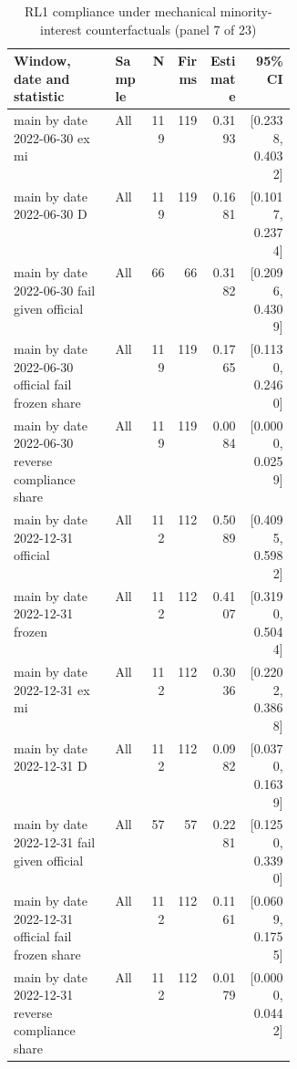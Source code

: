 \begin{table}[!htbp]\centering\scriptsize
\caption{RL1 compliance under mechanical minority-interest counterfactuals (panel 7 of 23)}
\begin{threeparttable}
\begin{tabular}{p{0.36\linewidth}lrrrr}
\toprule
Window, date and statistic & Sample & N & Firms & Estimate & 95\% CI \\
\midrule
main by date 2022-06-30 ex mi & All & 119 & 119 & 0.3193 & [0.2338, 0.4032] \\
main by date 2022-06-30 D & All & 119 & 119 & 0.1681 & [0.1017, 0.2374] \\
main by date 2022-06-30 fail given official & All & 66 & 66 & 0.3182 & [0.2096, 0.4309] \\
main by date 2022-06-30 official fail frozen share & All & 119 & 119 & 0.1765 & [0.1130, 0.2460] \\
main by date 2022-06-30 reverse compliance share & All & 119 & 119 & 0.0084 & [0.0000, 0.0259] \\
main by date 2022-12-31 official & All & 112 & 112 & 0.5089 & [0.4095, 0.5982] \\
main by date 2022-12-31 frozen & All & 112 & 112 & 0.4107 & [0.3190, 0.5044] \\
main by date 2022-12-31 ex mi & All & 112 & 112 & 0.3036 & [0.2202, 0.3868] \\
main by date 2022-12-31 D & All & 112 & 112 & 0.0982 & [0.0370, 0.1639] \\
main by date 2022-12-31 fail given official & All & 57 & 57 & 0.2281 & [0.1250, 0.3390] \\
main by date 2022-12-31 official fail frozen share & All & 112 & 112 & 0.1161 & [0.0609, 0.1755] \\
main by date 2022-12-31 reverse compliance share & All & 112 & 112 & 0.0179 & [0.0000, 0.0442] \\
\bottomrule
\end{tabular}
\begin{tablenotes}[flushleft]\footnotesize

\end{tablenotes}
\end{threeparttable}
\end{table}
